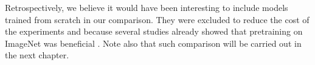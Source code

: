 Retrospectively, we believe it would have been interesting to include models trained from scratch in our comparison. They were excluded to reduce the cost of the experiments and because several studies already showed that pretraining on ImageNet was beneficial \cite{shin2016deep, tajbakhsh2016convolutional}. Note also that such comparison will be carried out in the next chapter.
